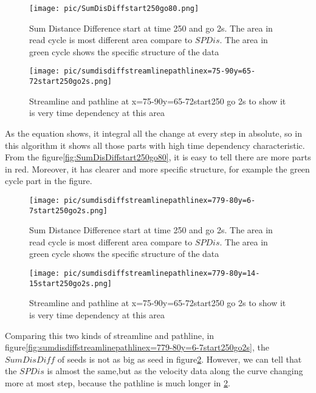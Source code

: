 \documentclass[
     11pt,         %
     a4paper,      %
     oneside,
     ]{article}
\begin{document}
\begin{figure}[H]
	\centering
 	\begin{minipage}{0.65\textwidth}
 		\centering
 		\texttt{[image: pic/SumDisDiffstart250go80.png]}
 		\caption{\tiny Sum Distance Difference start at time 250 and go 2s. The area in read cycle is most different area compare to $SPDis$. The area in green cycle shows the specific structure of the data }
 		\label{fig:SumDisDiffstart250go80}
 	\end{minipage}
 	\begin{minipage}{0.65\textwidth}
 		\centering
 		\texttt{[image: pic/sumdisdiffstreamlinepathlinex=75-90y=65-72start250go2s.png]}
 		\caption{\tiny Streamline and pathline at x=75-90y=65-72start250 go 2s to show it is very time dependency at this area}
 		\label{fig:sumdisdiffstreamlinepathlinex=75-90y=65-72start250go2s}
 		\end{minipage}						
\end{figure}
As the equation shows, it integral all the change at every step in absolute, so in this algorithm it shows all those parts with high time dependency characteristic. From the figure\ref{fig:SumDisDiffstart250go80}, it is easy to tell there are more parts in red. Moreover, it has clearer and more specific structure, for example the green cycle part in the figure\label{fig:SumDisDiffstart250go80}.
\begin{figure}[H]
	\centering
	\begin{minipage}{0.65\textwidth}
		\centering
		\texttt{[image: pic/sumdisdiffstreamlinepathlinex=779-80y=6-7start250go2s.png]}
		\caption{\tiny Sum Distance Difference start at time 250 and go 2s. The area in read cycle is most different area compare to $SPDis$. The area in green cycle shows the specific structure of the data }
		\label{fig:sumdisdiffstreamlinepathlinex=779-80y=6-7start250go2s}
	\end{minipage}
	\begin{minipage}{0.65\textwidth}
		\centering
		\texttt{[image: pic/sumdisdiffstreamlinepathlinex=779-80y=14-15start250go2s.png]}
		\caption{\tiny Streamline and pathline at x=75-90y=65-72start250 go 2s to show it is very time dependency at this area}
		\label{fig:sumdisdiffstreamlinepathlinex=779-80y=14-15start250go2s}
	\end{minipage}						
\end{figure}
Comparing this two kinds of streamline and pathline, in figure\ref{fig:sumdisdiffstreamlinepathlinex=779-80y=6-7start250go2s}, the $SumDisDiff$ of seeds is not as big as seed in figure\ref{fig:sumdisdiffstreamlinepathlinex=779-80y=14-15start250go2s}. However, we can tell that the $SPDis$ is almost the same,but as the velocity data along the curve changing more at most step, because the pathline is much longer in \ref{fig:sumdisdiffstreamlinepathlinex=779-80y=14-15start250go2s}.
\end{document}
